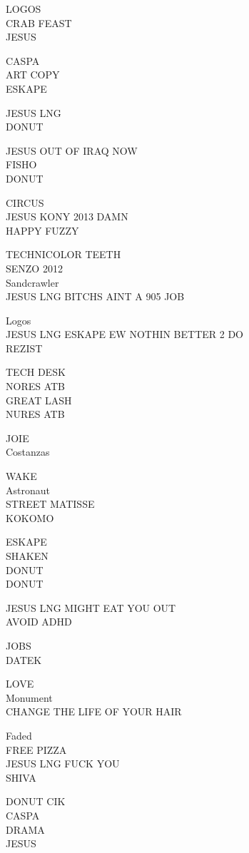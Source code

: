 \documentclass[10pt,letterpaper]{article}
\begin{document}
LOGOS\\
CRAB FEAST\\
JESUS

CASPA\\
ART COPY\\
ESKAPE

JESUS LNG\\
DONUT

JESUS OUT OF IRAQ NOW\\
FISHO\\
DONUT

CIRCUS\\
JESUS KONY 2013 DAMN\\
HAPPY FUZZY

TECHNICOLOR TEETH\\
SENZO 2012\\
Sandcrawler\\
JESUS LNG BITCHS AINT A 905 JOB

Logos\\
JESUS LNG ESKAPE EW NOTHIN BETTER 2 DO\\
REZIST

TECH DESK\\
NORES ATB\\
GREAT LASH\\
NURES ATB

JOIE\\
Costanzas

WAKE\\
Astronaut\\
STREET MATISSE\\
KOKOMO

ESKAPE\\
SHAKEN\\
DONUT\\
DONUT

JESUS LNG MIGHT EAT YOU OUT\\
AVOID ADHD

JOBS\\
DATEK

LOVE\\
Monument\\
CHANGE THE LIFE OF YOUR HAIR

Faded\\
FREE PIZZA\\
JESUS LNG FUCK YOU\\
SHIVA

DONUT CIK\\
CASPA\\
DRAMA\\
JESUS
\end{document}
